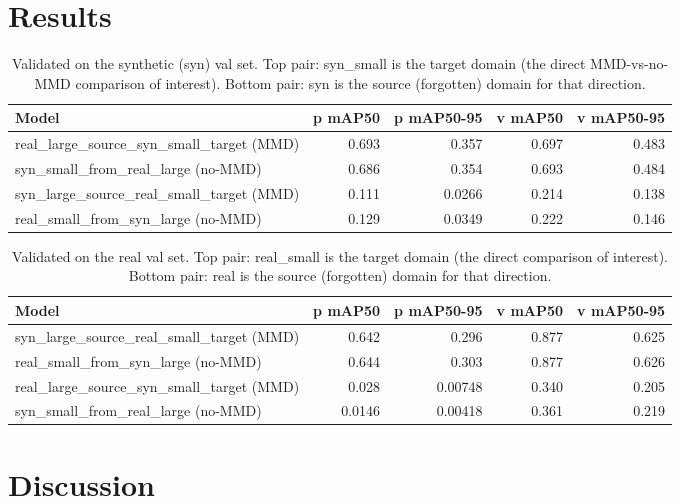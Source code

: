 \documentclass[11pt]{article}
\begin{document}
\section{Results}

\begin{table}[h!]
    \centering
    \begin{tabular}{lrrrr}
        \toprule
        Model & p mAP50 & p mAP50-95 & v mAP50 & v mAP50-95 \\
        \midrule
        real\_large\_source\_syn\_small\_target (MMD) & 0.693 & 0.357 & 0.697 & 0.483 \\
        syn\_small\_from\_real\_large (no-MMD) & 0.686 & 0.354 & 0.693 & 0.484 \\
        \midrule
        syn\_large\_source\_real\_small\_target (MMD) & 0.111 & 0.0266 & 0.214 & 0.138 \\
        real\_small\_from\_syn\_large (no-MMD) & 0.129 & 0.0349 & 0.222 & 0.146 \\
        \bottomrule
    \end{tabular}
    \caption{Validated on the synthetic (syn) val set. Top pair: syn\_small is the
    target domain (the direct MMD-vs-no-MMD comparison of interest). Bottom pair:
    syn is the source (forgotten) domain for that direction.}
\end{table}

\begin{table}[h!]
    \centering
    \begin{tabular}{lrrrr}
        \toprule
        Model & p mAP50 & p mAP50-95 & v mAP50 & v mAP50-95 \\
        \midrule
        syn\_large\_source\_real\_small\_target (MMD) & 0.642 & 0.296 & 0.877 & 0.625 \\
        real\_small\_from\_syn\_large (no-MMD) & 0.644 & 0.303 & 0.877 & 0.626 \\
        \midrule
        real\_large\_source\_syn\_small\_target (MMD) & 0.028 & 0.00748 & 0.340 & 0.205 \\
        syn\_small\_from\_real\_large (no-MMD) & 0.0146 & 0.00418 & 0.361 & 0.219 \\
        \bottomrule
    \end{tabular}
    \caption{Validated on the real val set. Top pair: real\_small is the target domain
    (the direct comparison of interest). Bottom pair: real is the source (forgotten)
    domain for that direction.}
\end{table}

\section{Discussion}
\end{document}
